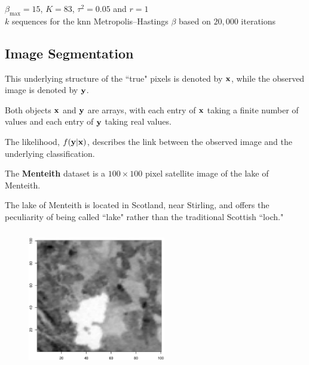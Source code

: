 \begin{slide}
\footnotesize \begin{center}
$\beta_{\max}=15$, $K=83$, $\tau^2=0.05$ and $r=1$ \\
$k$ sequences for the {\sf knn} Metropolis--Hastings $\beta$ 
based on $20,000$ iterations
\end{center}

\end{slide}

\subsection{Image Segmentation}\begin{slide}

This underlying structure of the ``true" pixels is denoted by $\mathbf{x}$, while the observed image is
denoted by $\mathbf{y}$. 

\vs \pause Both objects $\mathbf{x}$ and $\mathbf{y}$ are arrays, with each entry of $\mathbf{x}$ taking a finite number of
values and each entry of $\mathbf{y}$ taking real values. 

\vs \pause {}

\vs \pause The likelihood, $f(\mathbf{y}|\mathbf{x})$, describes the link between the observed image and the
underlying classification.

\end{slide}\begin{slide}

The {\bfseries Menteith} dataset is a $100\times 100$ pixel satellite image of the lake of Menteith.

\vs \pause The lake of Menteith is located in Scotland, near Stirling, and offers the
peculiarity of being called ``lake" rather than the traditional Scottish ``loch." 

\end{slide}\begin{slide}

\begin{figure}
\begin{center}
\includegraphics[width=6cm,height=6cm]{figures/menteith.eps}
\end{center}
\end{figure}


\end{slide}
